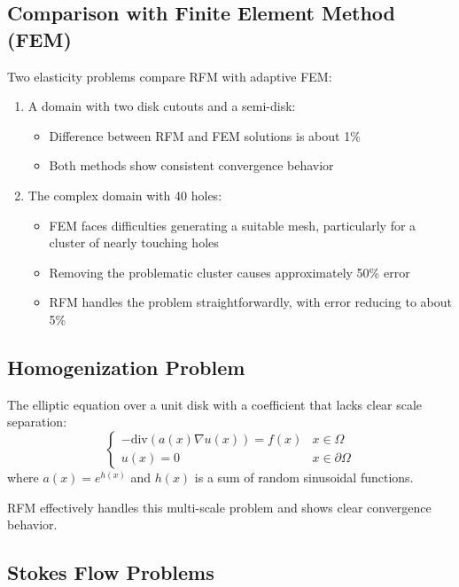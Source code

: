 \documentclass[11pt]{article}
\begin{document}
\subsection{Comparison with Finite Element Method (FEM)}
Two elasticity problems compare RFM with adaptive FEM:

\begin{enumerate}
    \item A domain with two disk cutouts and a semi-disk:
    \begin{itemize}
        \item Difference between RFM and FEM solutions is about 1\%
        \item Both methods show consistent convergence behavior
    \end{itemize}
    
    \item The complex domain with 40 holes:
    \begin{itemize}
        \item FEM faces difficulties generating a suitable mesh, particularly for a cluster of nearly touching holes
        \item Removing the problematic cluster causes approximately 50\% error
        \item RFM handles the problem straightforwardly, with error reducing to about 5\%
    \end{itemize}
\end{enumerate}

\subsection{Homogenization Problem}
The elliptic equation over a unit disk with a coefficient that lacks clear scale separation:
\begin{equation}
\begin{cases}
-\text{div}(a(x)\nabla u(x)) = f(x) & x \in \Omega \\
u(x) = 0 & x \in \partial\Omega
\end{cases}
\end{equation}
where $a(x) = e^{h(x)}$ and $h(x)$ is a sum of random sinusoidal functions.

RFM effectively handles this multi-scale problem and shows clear convergence behavior.

\subsection{Stokes Flow Problems}
\end{document}
